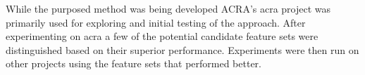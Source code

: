 While the purposed method was being developed ACRA's acra project was primarily used for exploring and initial testing of the approach. After experimenting on acra a few of the potential candidate feature sets were distinguished based on their superior performance. Experiments were then run on other projects using the feature sets that performed better.







